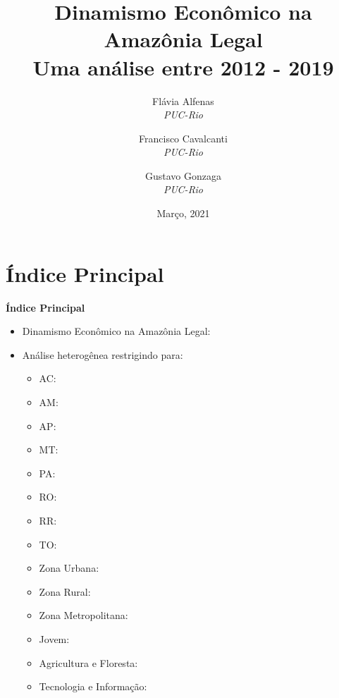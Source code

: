 \documentclass[8pt]{beamer}
\author{
Flávia  Alfenas\\
\textit{PUC-Rio}\\ \vspace{3mm}
\and  
Francisco Cavalcanti\\
\textit{PUC-Rio}\\ \vspace{3mm}
\and   
Gustavo Gonzaga \\
\textit{PUC-Rio} 
}
\date{Março, 2021}
\title{Dinamismo Econômico na Amazônia Legal \\ Uma análise entre 2012 - 2019}
\begin{document}

\begin{frame}
\titlepage
\end{frame}


\section{Índice Principal}

\begin{frame}[label=indice_principal]{}

\textbf{Índice Principal}
\vspace{2mm}
\begin{itemize}

\item{Dinamismo Econômico na Amazônia Legal: \hyperlink{indice_principal_amz}{}}
\vspace{3mm}

\item{Análise heterogênea restrigindo para:
	\begin{itemize}
	\item{AC: \hyperlink{indice_principal_amz_ac}{}}
	\item{AM: \hyperlink{indice_principal_amz_am}{}}
	\item{AP: \hyperlink{indice_principal_amz_ap}{}}
	\item{MT: \hyperlink{indice_principal_amz_mt}{}}
	\item{PA: \hyperlink{indice_principal_amz_pa}{}}
	\item{RO: \hyperlink{indice_principal_amz_ro}{}}
	\item{RR: \hyperlink{indice_principal_amz_rr}{}}
	\item{TO: \hyperlink{indice_principal_amz_to}{}}
	\item{Zona Urbana: \hyperlink{indice_principal_amz_urbana}{}}	
	\item{Zona Rural: \hyperlink{indice_principal_amz_rural}{}}
	\item{Zona Metropolitana: \hyperlink{indice_principal_amz_metropolitana}{}}
	\item{Jovem: \hyperlink{indice_principal_amz_jovem}{}}
	\item{Agricultura e Floresta: \hyperlink{indice_principal_amz_floresta}{}}
	\item{Tecnologia e Informação: \hyperlink{indice_principal_amz_ti}{}}
	\vspace{1mm}
	\end{itemize}
}


\end{itemize}
\end{frame}
\end{document}
